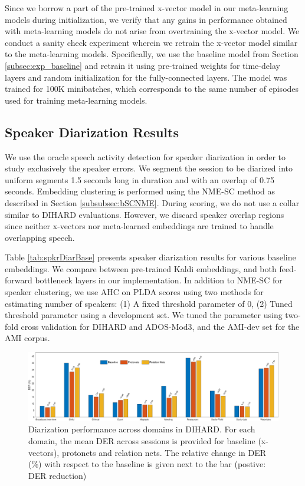Since we borrow a part of the pre-trained x-vector model in our meta-learning models during initialization, we verify that any gains in performance obtained with meta-learning models do not arise from overtraining the x-vector model.
We conduct a sanity check experiment wherein we retrain the x-vector model similar to the meta-learning models. Specifically, we use the baseline model from Section \ref{subsec:exp_baseline} and retrain it using pre-trained weights for time-delay layers and random initialization for the fully-connected layers. The model was trained for 100K minibatches, which corresponds to the same number of episodes used for training meta-learning models.

\subsection{Speaker Diarization Results}
\label{subsec:spkrDiarResults}

We use the oracle speech activity detection for speaker diarization in order to study exclusively the speaker errors. We segment the session to be diarized into uniform segments 1.5 seconds long in duration and with an overlap of 0.75 seconds. Embedding clustering is performed using the NME-SC method as described in Section \ref{subsubsec:bSCNME}. During scoring, we do not use a collar similar to DIHARD evaluations. However, we discard speaker overlap regions since neither x-vectors nor meta-learned embeddings are trained to handle overlapping speech.

Table \ref{tab:spkrDiarBase} presents speaker diarization results for various baseline embeddings. We compare between pre-trained Kaldi embeddings, and both feed-forward bottleneck layers in our implementation. In addition to NME-SC for speaker clustering, we use AHC on PLDA scores using two methods for estimating number of speakers: (1) A fixed threshold parameter of 0, (2) Tuned threshold parameter using a development set. We tuned the parameter using two-fold cross validation for DIHARD and ADOS-Mod3, and the AMI-dev set for the AMI corpus.

\begin{figure}[h]
    \centering
    \includegraphics[width=\textwidth]{fig/taslp_bar.pdf}
    \caption{Diarization performance across domains in DIHARD. For each domain, the mean DER across sessions is provided for baseline (x-vectors), protonets and relation nets. The relative change in DER (\%) with respect to the baseline is given next to the bar (postive: DER reduction)}
    \label{tab:domain_results}
\end{figure}

